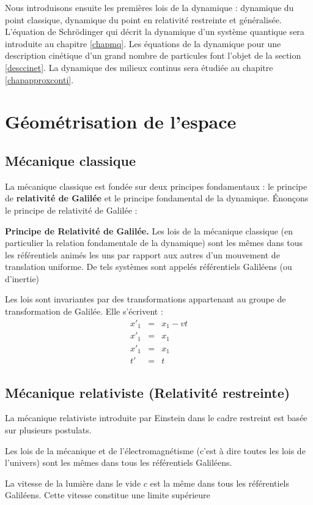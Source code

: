 \documentclass[12pt]{book}
\begin{document}
Nous introduisons ensuite les premi\`eres lois de la dynamique : dynamique du
point classique, dynamique du point en relativit\'e restreinte et
g\'en\'eralis\'ee.  L'\'equation
de Schr\"odinger qui d\'ecrit la dynamique d'un syst\`eme quantique sera
introduite au chapitre \ref{chapmq}. Les \'equations de la dynamique pour une
description cin\'etique d'un grand nombre de particules font l'objet de la
section \ref{desccinet}. La 
dynamique des milieux continus sera 
\'etudi\'ee au chapitre \ref{chapapproxconti}.


\section{G\'eom\'etrisation de l'espace}
\subsection{M\'ecanique classique}
La m\'ecanique classique est fond\'ee sur deux principes fondamentaux
: le principe de {\bf relativit\'e de Galil\'ee} et le principe fondamental
de la dynamique.
\'Enon\c cons le principe de relativit\'e de Galil\'ee :
\begin{prin}
{\bf Principe de Relativit\'e de Galil\'ee.}
Les lois de la m\'ecanique classique (en particulier la relation
fondamentale de la dynamique) sont les m\^emes dans tous les
r\'ef\'erentiels anim\'es les uns par rapport aux autres d'un mouvement de
translation uniforme. De tels syst\`emes sont appel\'es r\'ef\'erentiels
Galil\'eens (ou d'inertie)
\end{prin}
\begin{rem} Les lois sont invariantes par des transformations
appartenant au groupe de transformation de Galil\'ee. Elle s'\'ecrivent :
\begin{eqnarray}
x'_1&=&x_1-vt\\
x'_1&=&x_1\\
x'_1&=&x_1\\
t'&=&t
\end{eqnarray}
\end{rem}

\subsection{M\'ecanique relativiste (Relativit\'e
restreinte)}\label{secrelat} 
La m\'ecanique relativiste introduite par Einstein dans le cadre
restreint est bas\'ee sur plusieurs postulats.
\begin{postulat}
Les lois de la m\'ecanique et de l'\'electromagn\'etisme (c'est
\`a dire 
toutes les lois de l'univers) sont les m\^emes dans tous les
r\'ef\'erentiels Galil\'eens.
\end{postulat}
\begin{postulat}
La vitesse de la lumi\`ere dans le vide $c$ est la m\^eme dans tous
les r\'ef\'erentiels Galil\'eens. Cette vitesse constitue une limite
sup\'erieure
\end{postulat}
\end{document}
